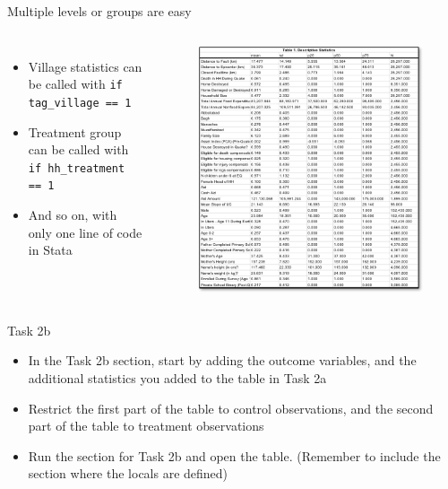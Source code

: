 \documentclass[aspectratio=169]{beamer}
\begin{document}
\begin{frame}[fragile]{Multiple levels or groups are easy}
	\begin{columns}[c]
		\begin{itemize}
			\item Village statistics can be called with \texttt{if tag\_village == 1}
			\item Treatment group can be called with \texttt{if hh\_treatment == 1}
			\item And so on, with only one line of code in Stata
		\end{itemize}
		\begin{figure}
			\centering
			\includegraphics[width=\linewidth]{img/table1}
		\end{figure}
	\end{columns}
\end{frame}


\begin{frame}{Task 2b}
	\begin{itemize}
		\item In the Task 2b section, start by adding the outcome variables, and the additional statistics you added to the table in Task 2a
		\item Restrict the first part of the table to control observations, and the second part of the table to treatment observations
		\item Run the section for Task 2b and open the table. (Remember to include the section where the locals are defined)
	\end{itemize}
\end{frame}
\end{document}
